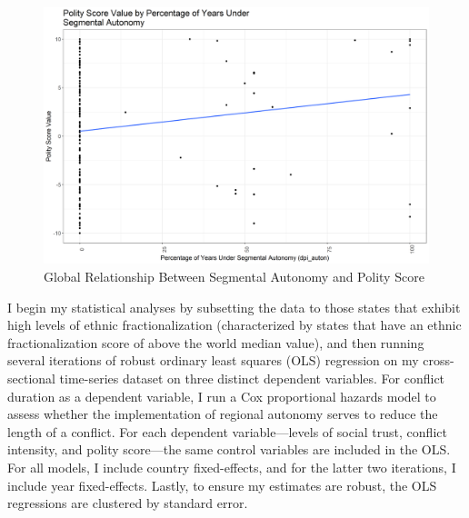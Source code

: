 \documentclass[12pt]{article}
\begin{document}
\begin{figure}[!htbp]
	\begin{center}
		\includegraphics[width = 6in]{csts_polity4_polity_score.png}
	\end{center}
	\caption{Global Relationship Between Segmental Autonomy and Polity Score}
\end{figure}

I begin my statistical analyses by subsetting the data to those states that exhibit high levels of ethnic fractionalization (characterized by states that have an ethnic fractionalization score of above the world median value), and then running several iterations of robust ordinary least squares (OLS) regression on my cross-sectional time-series dataset on three distinct dependent variables. For conflict duration as a dependent variable, I run a Cox proportional hazards model to assess whether the implementation of regional autonomy serves to reduce the length of a conflict. For each dependent variable---levels of social trust, conflict intensity, and polity score---the same control variables are included in the OLS. For all models, I include country fixed-effects, and for the latter two iterations, I include year fixed-effects. Lastly, to ensure my estimates are robust, the OLS regressions are clustered by standard error.  
\end{document}
